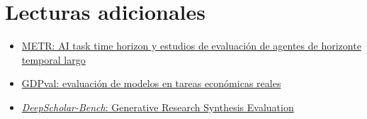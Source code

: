 \section{Lecturas adicionales}

\begin{itemize}
    \item \href{https://metr.org/}{METR: AI task time horizon y estudios de evaluación de agentes de horizonte temporal largo}
    \item \href{https://openai.com/index/gdpval/}{GDPval: evaluación de modelos en tareas económicas reales}
    \item \href{https://arxiv.org/search/?query=DeepScholar-Bench\&searchtype=all}{\emph{DeepScholar-Bench}: Generative Research Synthesis Evaluation}
\end{itemize}

